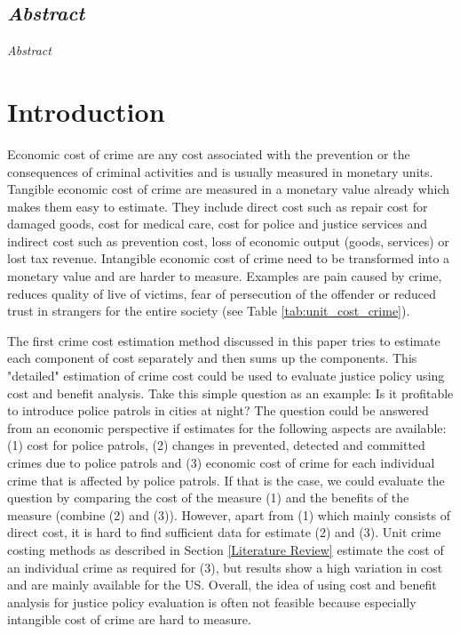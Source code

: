 \documentclass[a4paper,12pt]{article}
\begin{document}



\setcounter{page}{1}        %


\subsection*{\textit{Abstract}}

\textit{Abstract}


\section{Introduction}
\label{Introduction}
Economic cost of crime are any cost associated with the prevention or the consequences of criminal activities and is usually measured in monetary units.
Tangible economic cost of crime are measured in a monetary value already which makes them easy to estimate. They include direct cost such as repair cost for damaged goods, cost for medical care, cost for police and justice services and indirect cost such as prevention cost, loss of economic output (goods, services) or lost tax revenue.
Intangible economic cost of crime  need to be transformed into a monetary value and are harder to measure. Examples are pain caused by crime, reduces quality of live of victims, fear of persecution of the offender or reduced trust in strangers for the entire society (see Table \ref{tab:unit_cost_crime}).  \citep{kosten_nutzen_entorf} 

The first crime cost estimation method discussed in this paper tries to estimate each component of cost separately and then sums up the components.
This "detailed" estimation of crime cost could be used to evaluate justice policy using cost and benefit analysis. Take this simple question as an example: Is it profitable to introduce police patrols in cities at night? The question could be answered from an economic perspective if estimates for the following aspects are available: (1) cost for police patrols, (2) changes in prevented, detected and committed crimes due to police patrols and (3) economic cost of crime for each individual crime that is affected by police patrols. If that is the case, we could evaluate the question by comparing the cost of the measure (1) and the benefits of the measure (combine (2) and (3)).
However, apart from (1) which mainly consists of direct cost, it is hard to find sufficient data for estimate (2) and (3). Unit crime costing methods as described in Section \ref{Literature Review} estimate the cost of an individual crime as required for (3), but results show a high variation in cost and are mainly available for the US. 
Overall, the idea of using cost and benefit analysis for justice policy evaluation is often not feasible because especially intangible cost of crime are hard to measure.
\end{document}
